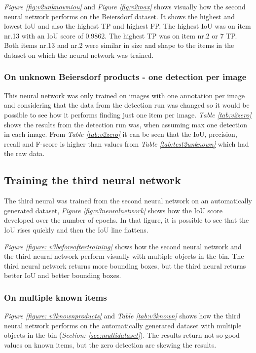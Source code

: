 \textit{Figure \ref{fig:v2unknowniou}} and \textit{Figure \ref{fig:v2max}} shows visually how the second neural network performs on the Beiersdorf dataset. It shows the highest and lowest IoU and also the highest TP and highest FP. The highest IoU was on item nr.13 with an IoU score of 0.9862. The highest TP was on item nr.2 or 7 TP. Both items nr.13 and nr.2 were similar in size and shape to the items in the dataset on which the neural network was trained.

\subsubsection{On unknown Beiersdorf products - one detection per image}
This neural network was only trained on images with one annotation per image and considering that the data from the detection run was changed so it would be possible to see how it performs finding just one item per image. \textit{Table \ref{tab:v2zero}} shows the results from the detection run was, when assuming max one detection in each image. From \textit{Table \ref{tab:v2zero}} it can be seen that the IoU, precision, recall and F-score is higher than values from \textit{Table \ref{tab:test2unknown}} which had the raw data.


\subsection{Training the third neural network}
The third neural was trained from the second neural network on an automatically generated dataset, \textit{Figure \ref{fig:v3neuralnetwork}} shows how the IoU score developed over the number of epochs. In that figure, it is possible to see that the IoU rises quickly and then the IoU line flattens.

\textit{Figure \ref{figure: v3beforeaftertraining}} shows how the second neural network and the third neural network perform visually with multiple objects in the bin. The third neural network returns more bounding boxes, but the third neural returns better IoU and better bounding boxes.

\subsubsection{On multiple known items}
\textit{Figure \ref{figure: v3knownproducts}} and \textit{Table \ref{tab:v3known}} shows how the third neural network performs on the automatically generated dataset with multiple objects in the bin (\textit{Section: \ref{sec:multidataset}}). The results return not so good values on known items, but the zero detection are skewing the results.

